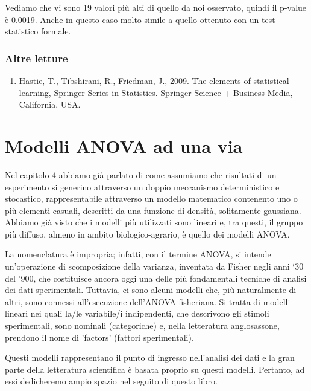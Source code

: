\documentclass[a4paper,12pt,oneside]{book}
\providecommand{\tightlist}{%
  \setlength{\itemsep}{0pt}\setlength{\parskip}{0pt}}
\begin{document}
Vediamo che vi sono 19 valori più alti di quello da noi osservato, quindi il p-value è 0.0019. Anche in questo caso molto simile a quello ottenuto con un test statistico formale.

\hypertarget{altre-letture-2}{%
\subsection{Altre letture}\label{altre-letture-2}}

\begin{enumerate}
\def\labelenumi{\arabic{enumi}.}
\tightlist
\item
  Hastie, T., Tibshirani, R., Friedman, J., 2009. The elements of statistical learning, Springer Series in Statistics. Springer Science + Business Media, California, USA.
\end{enumerate}

\hypertarget{modelli-anova-ad-una-via}{%
\chapter{Modelli ANOVA ad una via}\label{modelli-anova-ad-una-via}}

Nel capitolo 4 abbiamo già parlato di come assumiamo che risultati di un esperimento si generino attraverso un doppio meccanismo deterministico e stocastico, rappresentabile attraverso un modello matematico contenento uno o più elementi casuali, descritti da una funzione di densità, solitamente gaussiana. Abbiamo già visto che i modelli più utilizzati sono lineari e, tra questi, il gruppo più diffuso, almeno in ambito biologico-agrario, è quello dei modelli ANOVA.

La nomenclatura è impropria; infatti, con il termine ANOVA, si intende un'operazione di scomposizione della varianza, inventata da Fisher negli anni `30 del '900, che costituisce ancora oggi una delle più fondamentali tecniche di analisi dei dati sperimentali. Tuttavia, ci sono alcuni modelli che, più naturalmente di altri, sono connessi all'esecuzione dell'ANOVA fisheriana. Si tratta di modelli lineari nei quali la/le variabile/i indipendenti, che descrivono gli stimoli sperimentali, sono nominali (categoriche) e, nella letteratura anglosassone, prendono il nome di 'factors' (fattori sperimentali).

Questi modelli rappresentano il punto di ingresso nell'analisi dei dati e la gran parte della letteratura scientifica è basata proprio su questi modelli. Pertanto, ad essi dedicheremo ampio spazio nel seguito di questo libro.
\end{document}
